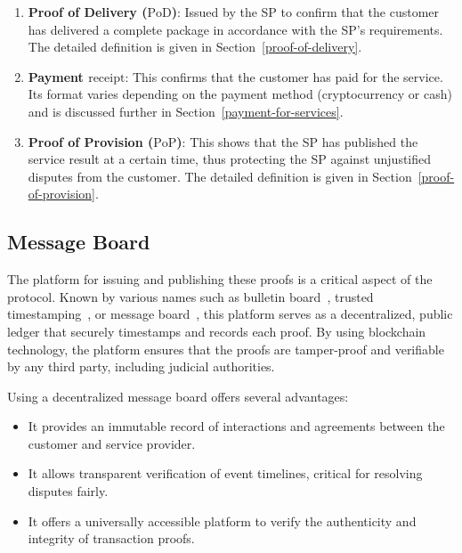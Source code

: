 \documentclass[pdftex,twocolumn,epjc3]{svjour3}
\begin{document}
\begin{enumerate}
  \item \textbf{Proof of Delivery ($\textrm{PoD}$)}: Issued by the SP to confirm that the customer has delivered a complete package in accordance with the SP's requirements. The detailed definition is given in Section~\ref{proof-of-delivery}.
  
  \item \textbf{Payment $\textrm{receipt}$}: This confirms that the customer has paid for the service. Its format varies depending on the payment method (cryptocurrency or cash) and is discussed further in Section~\ref{payment-for-services}.
  
  \item \textbf{Proof of Provision ($\textrm{PoP}$)}: This shows that the SP has published the service result at a certain time, thus protecting the SP against unjustified disputes from the customer. The detailed definition is given in Section~\ref{proof-of-provision}.
\end{enumerate}

\subsection{Message Board}\label{sec:message-board}
The platform for issuing and publishing these proofs is a critical aspect of the protocol. Known by various names such as bulletin board~\cite{achenbachImprovedCoercionresistantElectronic2015}, trusted timestamping~\cite{gippDecentralizedTrustedTimestamping2015}, or message board~\cite{hinarejosSolutionSecureCertified2019}, this platform serves as a decentralized, public ledger that securely timestamps and records each proof. By using blockchain technology, the platform ensures that the proofs are tamper-proof and verifiable by any third party, including judicial authorities.

Using a decentralized message board offers several advantages:
\begin{itemize}

  \item It provides an immutable record of interactions and agreements between the customer and service provider.

  \item It allows transparent verification of event timelines, critical for resolving disputes fairly.

  \item It offers a universally accessible platform to verify the authenticity and integrity of transaction proofs.
\end{itemize}
\end{document}
